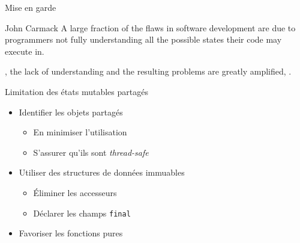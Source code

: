 
\begingroup

\begin{frame}{Mise en garde}

  \begin{shadequote}{John Carmack}
    A large fraction of the flaws in software development are due to programmers not fully understanding all the possible states their code may execute in.

    , the lack of understanding and the resulting problems are greatly amplified, .
  \end{shadequote}

  \begin{alertblock}{Limitation des états mutables partagés}
    \begin{itemize}
    \item Identifier les objets partagés
      \begin{itemize}
      \item En minimiser l'utilisation
      \item S'assurer qu'ils sont \textit{thread-safe}
      \end{itemize}
    \item Utiliser des structures de données immuables
      \begin{itemize}
      \item Éliminer les accesseurs
      \item Déclarer les champs \lstinline{final}
      \end{itemize}
    \item Favoriser les fonctions pures
    \end{itemize}
  \end{alertblock}        

\end{frame}

\endgroup
\endinput
